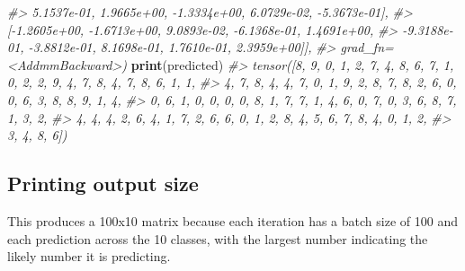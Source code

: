 \documentclass[]{book}
\newenvironment{Shaded}{\begin{snugshade}}{\end{snugshade}}
\newcommand{\CommentTok}[1]{\textcolor[rgb]{0.56,0.35,0.01}{\textit{#1}}}
\newcommand{\KeywordTok}[1]{\textcolor[rgb]{0.13,0.29,0.53}{\textbf{#1}}}
\newcommand{\NormalTok}[1]{#1}
\begin{document}
\begin{Shaded}
\begin{Highlighting}[]
\CommentTok{#>           5.1537e-01,  1.9665e+00, -1.3334e+00,  6.0729e-02, -5.3673e-01],}
\CommentTok{#>         [-1.2605e+00, -1.6713e+00,  9.0893e-02, -6.1368e-01,  1.4691e+00,}
\CommentTok{#>          -9.3188e-01, -3.8812e-01,  8.1698e-01,  1.7610e-01,  2.3959e+00]],}
\CommentTok{#>        grad_fn=<AddmmBackward>)}
\KeywordTok{print}\NormalTok{(predicted)}
\CommentTok{#> tensor([8, 9, 0, 1, 2, 7, 4, 8, 6, 7, 1, 0, 2, 2, 9, 4, 7, 8, 4, 7, 8, 6, 1, 1,}
\CommentTok{#>         4, 7, 8, 4, 4, 7, 0, 1, 9, 2, 8, 7, 8, 2, 6, 0, 0, 6, 3, 8, 8, 9, 1, 4,}
\CommentTok{#>         0, 6, 1, 0, 0, 0, 0, 8, 1, 7, 7, 1, 4, 6, 0, 7, 0, 3, 6, 8, 7, 1, 3, 2,}
\CommentTok{#>         4, 4, 4, 2, 6, 4, 1, 7, 2, 6, 6, 0, 1, 2, 8, 4, 5, 6, 7, 8, 4, 0, 1, 2,}
\CommentTok{#>         3, 4, 8, 6])}
\end{Highlighting}
\end{Shaded}

\hypertarget{printing-output-size}{%
\subsection{Printing output size}\label{printing-output-size}}

This produces a 100x10 matrix because each iteration has a batch size of 100 and each prediction across the 10 classes, with the largest number indicating the likely number it is predicting.
\end{document}
